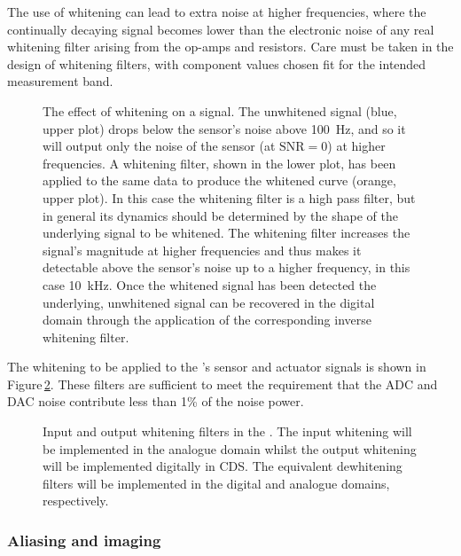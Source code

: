 The use of whitening can lead to extra noise at higher frequencies, where the continually decaying signal becomes lower than the electronic noise of any real whitening filter arising from the op-amps and resistors. Care must be taken in the design of whitening filters, with component values chosen fit for the intended measurement band.

\begin{figure}
  \centering
  
  \caption[The effect of whitening on a signal]{\label{fig:whitening}The effect of whitening on a signal. The unwhitened signal (blue, upper plot) drops below the sensor's noise above \SI{100}{\hertz}, and so it will output only the noise of the sensor (at $\text{SNR} = 0$) at higher frequencies. A whitening filter, shown in the lower plot, has been applied to the same data to produce the whitened curve (orange, upper plot). In this case the whitening filter is a high pass filter, but in general its dynamics should be determined by the shape of the underlying signal to be whitened. The whitening filter increases the signal's magnitude at higher frequencies and thus makes it detectable above the sensor's noise up to a higher frequency, in this case \SI{10}{\kilo\hertz}. Once the whitened signal has been detected the underlying, unwhitened signal can be recovered in the digital domain through the application of the corresponding inverse whitening filter.}
\end{figure}

The whitening to be applied to the \SSMEXPT{}'s sensor and actuator signals is shown in Figure\,\ref{fig:whitening-tfs}. These filters are sufficient to meet the requirement that the \gls{ADC} and \gls{DAC} noise contribute less than 1\% of the noise power.

\begin{figure}
  \centering
  
  \caption[Input and output whitening filters in the \SSMEXPT{}]{\label{fig:whitening-tfs}Input and output whitening filters in the \SSMEXPT{}. The input whitening will be implemented in the analogue domain whilst the output whitening will be implemented digitally in CDS. The equivalent dewhitening filters will be implemented in the digital and analogue domains, respectively.}
\end{figure}

\subsubsection{Aliasing and imaging}

